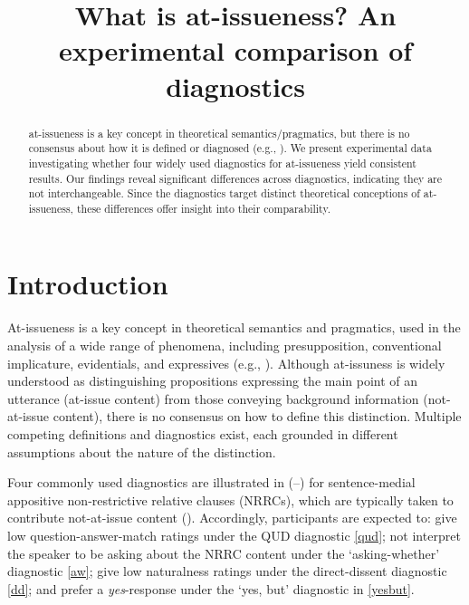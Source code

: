 \documentclass[times,linguex,xcolor]{glossa}
\title[What is at-issueness?]{What is at-issueness? An experimental comparison of diagnostics\\ 
  }
\author[]%
{%
}
\begin{document}
\maketitle


\begin{abstract}
  at-issueness is a key concept in theoretical semantics/pragmatics, but there is no consensus about how it is defined or diagnosed (e.g., \citealt{tonhauser_diagnosing_2012,snider_anaphoric_2017,snider_distinguishing_2018,tonhauser_how_2018,koev_notions_2018,faller_discourse_2019,korotkova_evidential_2020}). We present experimental data investigating whether four widely used diagnostics for at-issueness yield consistent results. Our findings reveal significant differences across diagnostics, indicating they are not interchangeable. Since the diagnostics target distinct theoretical conceptions of at-issueness, these differences offer insight into their comparability.

\end{abstract}


\section{Introduction \label{sec:1_introduction}}
  
  At-issueness is a key concept in theoretical semantics and pragmatics, used in the analysis of a wide range of phenomena, including presupposition, conventional implicature, evidentials, and expressives (e.g., \citealt{karttunen_conventional_1979,horton_presuppositions_1988,abbott_presuppositions_2000,faller_semantics_2003,potts_logic_2005,tonhauser_diagnosing_2012}). Although at-issuness is widely understood as distinguishing propositions expressing the main point of an utterance (at-issue content) from those conveying background information (not-at-issue content), there is no consensus on how to define this distinction. Multiple competing definitions and diagnostics exist, each grounded in different assumptions about the nature of the distinction.

  Four commonly used diagnostics are illustrated in (--) for sentence-medial appositive non-restrictive relative clauses (NRRCs), which are typically taken to contribute not-at-issue content (\citealt{potts_logic_2005}). Accordingly, participants are expected to: give low question-answer-match ratings under the QUD diagnostic \ref{qud}; not interpret the speaker to be asking about the NRRC content under the `asking-whether' diagnostic \ref{aw}; give low naturalness ratings under the direct-dissent diagnostic \ref{dd}; and prefer a \emph{yes}-response under the `yes, but' diagnostic in \ref{yesbut}.
\end{document}
